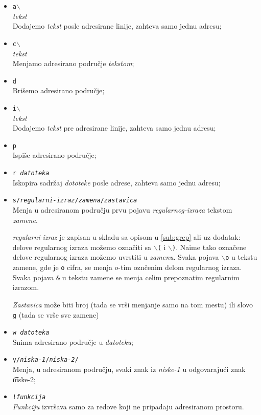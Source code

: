 \documentclass[12pt,a4paper,titlepage]{article}
\def\bs{$\backslash$}
\begin{document}
      \begin{itemize}
      \item
        {\tt a\bs}\\
        {\it tekst}\\
        Dodajemo {\it tekst} posle adresirane linije, zahteva samo jednu
        adresu;
      \item
        {\tt c\bs}\\
        {\it tekst}\\
        Menjamo adresirano podru\v cje {\it tekstom};
      \item
        {\tt d}\\
        Bri\v semo adresirano podru\v cje;
      \item
        {\tt i\bs}\\
        {\it tekst}\\
        Dodajemo {\it tekst} pre adresirane linije, zahteva samo jednu adresu;
      \item
        {\tt p}\\
        Ispi\v se adresirano podru\v cje;
      \item
        {\tt r {\it datoteka}}\\
        Iskopira sadr\v zaj {\it dototeke} posle adrese, zahteva samo jednu
        adresu;
      \item
        {\tt s/{\it regularni-izraz}/{\it zamena}/{\it zastavica}}\\
        Menja u adresiranom podru\v cju prvu pojavu {\it regularnog-izraza}
        tekstom {\it zamene}.

        {\it regularni-izraz} je zapisan u skladu sa opisom u \ref{sub:grep}
        ali uz dodatak: delove regularnog izraza mo\v zemo ozna\v citi sa
        {\tt\bs(} i {\tt\bs)}.
        Naime tako ozna\v cene delove regularnog izraza mo\v zemo uvrstiti u
        {\it zamenu}.
        Svaka pojava {\tt\bs o} u tekstu zamene, gde je {\tt o} cifra, se
        menja $o$-tim ozn\v cenim delom regularnog izraza.
        Svaka pojava {\tt\&} u tekstu zamene se menja celim prepoznatim
        regularnim izrazom.

        {\it Zastavica} mo\v ze biti broj (tada se vr\v si menjanje samo na
        tom mestu) ili slovo {\tt g} (tada se vr\v se sve zamene)
      \item
        {\tt w {\it datoteka}}\\
        Snima adresirano podru\v cje u {\it datoteku};
      \item
        {\tt y/{\it niska-1}/{\it niska-2}/}\\
        Menja, u adresiranom podru\v cju, svaki znak iz {\it niske-1} u
        odgovaraju\'ci znak {\t niske-2};
      \item
        {\tt!{\it funkcija}}\\
        {\it Funkciju} izvr\v sava samo za redove koji ne pripadaju
        adresiranom prostoru.
      \end{itemize}
\end{document}
